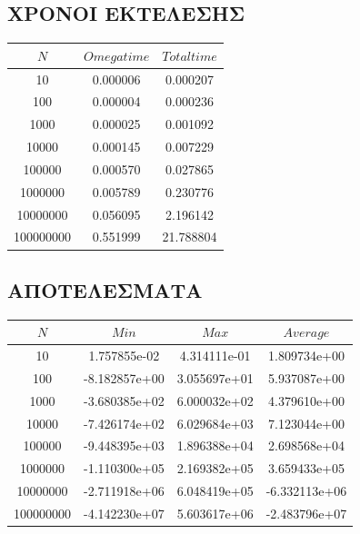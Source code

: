 \documentclass{FR16}
\begin{document}
\subsection{ΧΡΟΝΟΙ ΕΚΤΕΛΕΣΗΣ}
\begin{center}
\begin{tabular}{c c c}
\arrayrulecolor{Azzurro}
\hline
{\bfseries $Ν$} & {\bfseries $Omega time$} & {\bfseries $Total time$}\\
\hline
10    & 0.000006 & 0.000207 \\
100   & 0.000004 & 0.000236 \\
1000  & 0.000025 & 0.001092 \\
10000 & 0.000145 & 0.007229 \\
100000 & 0.000570 & 0.027865 \\
1000000 & 0.005789 & 0.230776 \\
10000000 & 0.056095 & 2.196142 \\
100000000 & 0.551999 & 21.788804 \\
\hline
\end{tabular}
\end{center}

\subsection{ΑΠΟΤΕΛΕΣΜΑΤΑ}
\begin{center}
\begin{tabular}{c c c c}
\arrayrulecolor{Azzurro}
\hline
{\bfseries $Ν$} & {\bfseries $Min$} & {\bfseries $Max$} & {\bfseries $Average$}\\
\hline
10    & 1.757855e-02 & 4.314111e-01 & 1.809734e+00 \\
100   & -8.182857e+00 & 3.055697e+01 & 5.937087e+00 \\
1000  & -3.680385e+02 & 6.000032e+02  & 4.379610e+00 \\
10000 & -7.426174e+02 & 6.029684e+03 & 7.123044e+00 \\
100000 & -9.448395e+03 & 1.896388e+04 & 2.698568e+04 \\
1000000 & -1.110300e+05  & 2.169382e+05  & 3.659433e+05 \\
10000000 & -2.711918e+06 &  6.048419e+05 &  -6.332113e+06 \\
100000000 & -4.142230e+07  & 5.603617e+06   & -2.483796e+07 \\
\hline
\end{tabular}
\end{center}
\newpage
\end{document}
